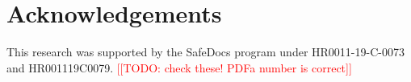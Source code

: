 \documentclass[conference,10pt]{IEEEtran}
\newcommand{\note}[1]{\noteYes{#1}}
\newcommand{\noteYes}[1]{\textcolor{red}{[[#1]]}}
\newcommand{\todo}[1]{\note{TODO: #1}}
\begin{document}


\section*{Acknowledgements}

This research was supported by the SafeDocs program under HR0011-19-C-0073 and HR001119C0079.
\todo{check these! PDFa number is correct}





\appendix


\end{document}
